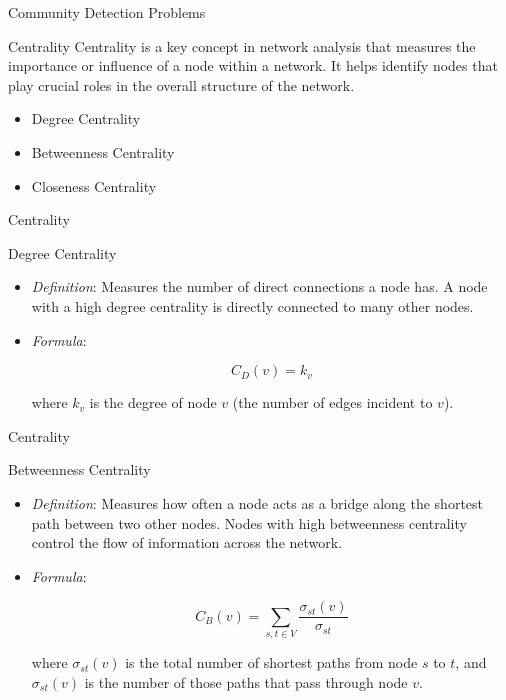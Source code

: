 \documentclass[compress]{beamer}
\begin{document}
\begin{frame}[t]{Community Detection Problems}
    \begin{block}{Centrality}
        Centrality is a key concept in network analysis that measures the importance or influence of a node within a network. It helps identify nodes that play crucial roles in the overall structure of the network.
        \begin{itemize}
            \item Degree Centrality
            \item Betweenness Centrality
            \item Closeness Centrality
        \end{itemize}
    \end{block}
\end{frame}

\begin{frame}[t]{Centrality}
    \begin{block}{Degree Centrality}
        \begin{itemize}
            \item \textit{Definition}: Measures the number of direct connections a node has. A node with a high degree centrality is directly connected to many other nodes.
            \item \textit{Formula}:
        
            \[C_{D}(v) = k_v\]
        
            where \(k_v\) is the degree of node \(v\) (the number of edges incident to \(v\)).
        \end{itemize}
    \end{block}
\end{frame}

\begin{frame}[t]{Centrality}
    \begin{block}{Betweenness Centrality}
        \begin{itemize}
            \item \textit{Definition}:  Measures how often a node acts as a bridge along the shortest path between two other nodes. Nodes with high betweenness centrality control the flow of information across the network.
            \item \textit{Formula}:
        
            \[C_B(v) = \sum_{s,t \in V} \frac{\sigma_{st}(v)}{\sigma_{st}}\]
        
            where \(\sigma_{st}(v)\) is the total number of shortest paths from node \(s\) to \(t\), and \(\sigma_{st}(v)\) is the number of those paths that pass through node \(v\).
        \end{itemize}
    \end{block}
\end{frame}
\end{document}
